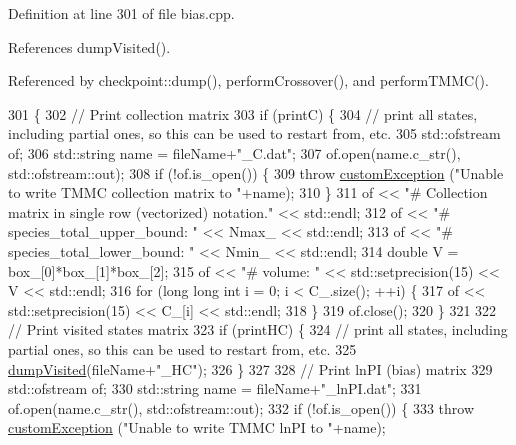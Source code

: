 Definition at line 301 of file bias.\-cpp.



References dump\-Visited().



Referenced by checkpoint\-::dump(), perform\-Crossover(), and perform\-T\-M\-M\-C().


\begin{DoxyCode}
301                                                                      \{
302     \textcolor{comment}{// Print collection matrix}
303     \textcolor{keywordflow}{if} (printC) \{
304         \textcolor{comment}{// print all states, including partial ones, so this can be used to restart from, etc.}
305         std::ofstream of;
306         std::string name = fileName+\textcolor{stringliteral}{"\_C.dat"};
307         of.open(name.c\_str(), std::ofstream::out);
308         \textcolor{keywordflow}{if} (!of.is\_open()) \{
309             \textcolor{keywordflow}{throw} \hyperlink{classcustom_exception}{customException} (\textcolor{stringliteral}{"Unable to write TMMC collection matrix to "}+name);
310         \}
311         of << \textcolor{stringliteral}{"# Collection matrix in single row (vectorized) notation."} << std::endl;
312         of << \textcolor{stringliteral}{"# species\_total\_upper\_bound: "} << Nmax\_ << std::endl;
313         of << \textcolor{stringliteral}{"# species\_total\_lower\_bound: "} << Nmin\_ << std::endl;
314         \textcolor{keywordtype}{double} V = box\_[0]*box\_[1]*box\_[2];
315         of << \textcolor{stringliteral}{"# volume: "} << std::setprecision(15) << V << std::endl;
316         \textcolor{keywordflow}{for} (\textcolor{keywordtype}{long} \textcolor{keywordtype}{long} \textcolor{keywordtype}{int} i = 0; i < C\_.size(); ++i) \{
317             of << std::setprecision(15) << C\_[i] << std::endl;
318         \}
319         of.close();
320     \}
321 
322     \textcolor{comment}{// Print visited states matrix}
323     \textcolor{keywordflow}{if} (printHC) \{
324         \textcolor{comment}{// print all states, including partial ones, so this can be used to restart from, etc.}
325         \hyperlink{classtmmc_a295886d2f7a947a9de890bcb3adb51c7}{dumpVisited}(fileName+\textcolor{stringliteral}{"\_HC"});
326     \}
327 
328     \textcolor{comment}{// Print lnPI (bias) matrix}
329     std::ofstream of;
330     std::string name = fileName+\textcolor{stringliteral}{"\_lnPI.dat"};
331     of.open(name.c\_str(), std::ofstream::out);
332     \textcolor{keywordflow}{if} (!of.is\_open()) \{
333         \textcolor{keywordflow}{throw} \hyperlink{classcustom_exception}{customException} (\textcolor{stringliteral}{"Unable to write TMMC lnPI to "}+name);

\end{DoxyCode}
